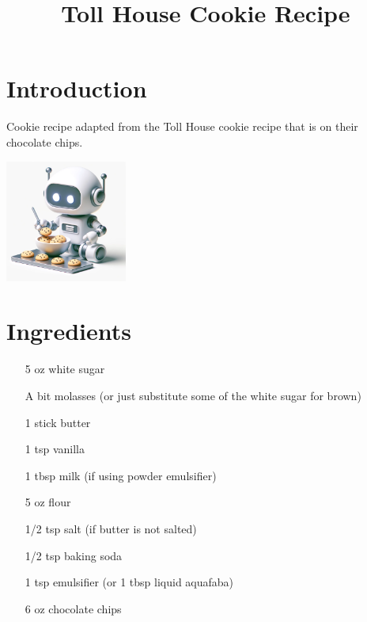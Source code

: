 \documentclass[twocolumn]{article}
\title{\color{titlecolor}\textbf{Toll House Cookie Recipe}}
\date{}
\begin{document}
\maketitle

\section*{\color{sectioncolor}Introduction}
Cookie recipe adapted from the Toll House cookie recipe that is on their chocolate chips.

\begin{center}
    \includegraphics[width=0.3\textwidth]{assets/robot_cookies.png}
\end{center}

\section*{\color{sectioncolor}Ingredients}
\begin{itemize}[align=left]
    \item [5 oz] white sugar
    \item [A bit] molasses (or just substitute some of the white sugar for brown)
    \item [1 stick] butter
    \item [1 tsp] vanilla
    \item [1 tbsp] milk (if using powder emulsifier)
    \item [5 oz] flour
    \item [1/2 tsp] salt (if butter is not salted)
    \item [1/2 tsp] baking soda
    \item [1 tsp] emulsifier (or 1 tbsp liquid aquafaba)
    \item [6 oz] chocolate chips
\end{itemize}
\end{document}
